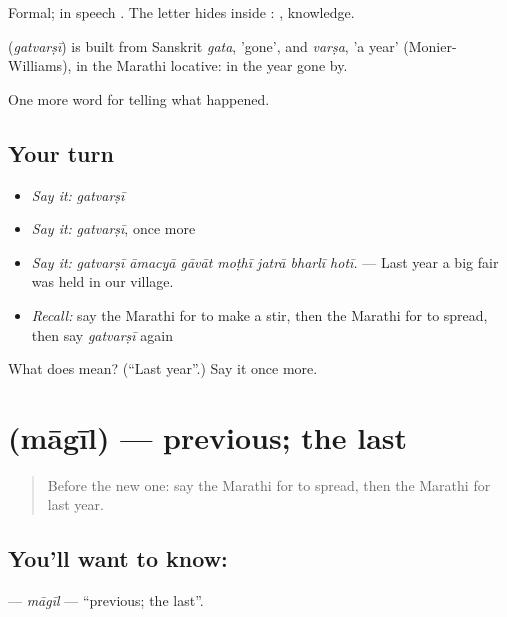 Formal; in speech  . The letter  hides inside : , knowledge.

\begin{cousinweb}
\textbf{} (\emph{gatvarṣī}) is built from Sanskrit \emph{gata}, 'gone', and \emph{varṣa}, 'a year' (Monier-Williams), in the Marathi locative: in the year gone by.
\end{cousinweb}

\begin{grammarlens}[title={What you've built}]
One more word for telling what happened.
\end{grammarlens}

\subsection*{Your turn}
\begin{itemize}
\raggedright
  \item \emph{Say it:} \emph{gatvarṣī}
  \item \emph{Say it:} \emph{gatvarṣī}, once more
  \item \emph{Say it:} \emph{gatvarṣī āmacyā gāvāt moṭhī jatrā bharlī hotī.} — Last year a big fair was held in our village.
  \item \emph{Recall:} say the Marathi for to make a stir, then the Marathi for to spread, then say \emph{gatvarṣī} again
\end{itemize}

\begin{tcolorbox}[breakable,colback=teal!4,colframe=teal!35!black,title={Before you move on}]
What does  mean? (\textquotedblleft{}Last year\textquotedblright{}.) Say it once more.
\end{tcolorbox}
\section[\texorpdfstring{\mr{मागील} (māgīl)}{मागील (māgīl)}]{ (māgīl) — previous; the last}

\label{lesson:MR-C305-magil}



\begin{quote}
Before the new one: say the Marathi for to spread, then the Marathi for last year.
\end{quote}

\subsection*{You'll want to know: }
\textbf{} — \emph{māgīl} — \textquotedblleft{}previous; the last\textquotedblright{}.

